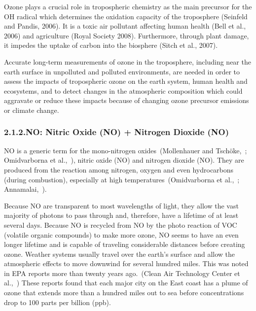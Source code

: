\documentclass[9pt]{report}
\begin{document}
Ozone plays a crucial role in tropospheric chemistry as the main precursor for the OH radical which determines the oxidation capacity of the troposphere (Seinfeld and Pandis, 2006). 
It is a toxic air pollutant affecting human health (Bell et al., 2006) and agriculture (Royal Society 2008).
Furthermore, through plant damage, it impedes the uptake of carbon into the biosphere (Sitch et al., 2007).%

Accurate long-term measurements of ozone in the troposphere, including near the earth surface in unpolluted and polluted environments, are needed in order to assess the impacts of tropospheric ozone on the earth system, human health and ecosystems, and to detect changes in the atmospheric composition which could aggravate or reduce these impacts because of changing ozone precursor emissions or climate change.%

\subsubsection{2.1.2.\hspace*{0.5em}NO: Nitric Oxide (NO) + Nitrogen Dioxide (NO)}\label{sec-nox--nitric-oxide-no-nitrogen-dioxide-no2}%

\noindent{}NO is a generic term for the mono-nitrogen oxides~(Mollenhauer and Tschöke,~; Omidvarborna et al.,~), nitric oxide (NO) and nitrogen dioxide (NO).
They are produced from the reaction among nitrogen, oxygen and even hydrocarbons (during combustion), especially at high temperatures~(Omidvarborna et al.,~; Annamalai,~).%

Because NO are transparent to most wavelengths of light, they allow the vast majority of photons to pass through and, therefore, have a lifetime of at least several days. 
Because NO is  recycled from NO by the photo reaction of VOC (volatile organic compounds) to make more ozone, NO seems to have an even longer lifetime and is capable of traveling considerable distances before creating ozone.  Weather systems usually travel over the earth’s surface and allow the atmospheric effects to move downwind for several hundred miles.
This was noted in EPA reports more than twenty years ago.~(Clean Air Technology Center et al.,~)
These reports found that each major city on the East coast has a plume of ozone that extends more than a hundred miles out to sea before concentrations drop to 100 parts per billion (ppb).%
\end{document}
